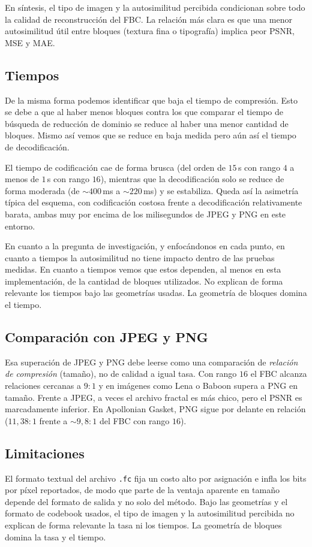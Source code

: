 En síntesis, el tipo de imagen y la autosimilitud percibida condicionan sobre todo la calidad de reconstrucción del FBC. La relación más clara es que una menor autosimilitud útil entre bloques (textura fina o tipografía) implica peor PSNR, MSE y MAE.

\subsection{Tiempos}

De la misma forma podemos identificar que baja el tiempo de compresión. Esto se debe a que al haber menos bloques contra los que comparar el tiempo de búsqueda de reducción de dominio se reduce al haber una menor cantidad de bloques. Mismo así vemos que se reduce en baja medida pero aún así el tiempo de decodificación.

El tiempo de codificación cae de forma brusca (del orden de $15$\,s con rango $4$ a menos de $1$\,s con rango $16$), mientras que la decodificación solo se reduce de forma moderada (de $\sim 400$\,ms a $\sim 220$\,ms) y se estabiliza. Queda así la asimetría típica del esquema, con codificación costosa frente a decodificación relativamente barata, ambas muy por encima de los milisegundos de JPEG y PNG en este entorno.

En cuanto a la pregunta de investigación, y enfocándonos en cada punto, en cuanto a tiempos la autosimilitud no tiene impacto dentro de las pruebas medidas. En cuanto a tiempos vemos que estos dependen, al menos en esta implementación, de la cantidad de bloques utilizados. No explican de forma relevante los tiempos bajo las geometrías usadas. La geometría de bloques domina el tiempo.

\subsection{Comparación con JPEG y PNG}

Esa superación de JPEG y PNG debe leerse como una comparación de \emph{relación de compresión} (tamaño), no de calidad a igual tasa. Con rango $16$ el FBC alcanza relaciones cercanas a $9{:}1$ y en imágenes como Lena o Baboon supera a PNG en tamaño. Frente a JPEG, a veces el archivo fractal es más chico, pero el PSNR es marcadamente inferior. En Apollonian Gasket, PNG sigue por delante en relación ($11{,}38{:}1$ frente a $\sim 9{,}8{:}1$ del FBC con rango $16$).

\subsection{Limitaciones}

El formato textual del archivo \texttt{.fc} fija un costo alto por asignación e infla los bits por píxel reportados, de modo que parte de la ventaja aparente en tamaño depende del formato de salida y no solo del método. Bajo las geometrías y el formato de codebook usados, el tipo de imagen y la autosimilitud percibida no explican de forma relevante la tasa ni los tiempos. La geometría de bloques domina la tasa y el tiempo.
